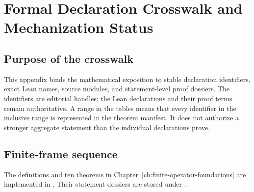 \chapter{Formal Declaration Crosswalk and Mechanization Status}
\label{app:formal-crosswalk}
\small
\sloppy
{}

\section{Purpose of the crosswalk}

This appendix binds the mathematical exposition to stable declaration identifiers,
exact Lean names, source modules, and statement-level proof dossiers. The identifiers
are editorial handles; the Lean declarations and their proof terms remain authoritative.
A range in the tables means that every identifier in the inclusive range is represented
in the theorem manifest. It does not authorize a stronger aggregate statement than the
individual declarations prove.

\section{Finite-frame sequence}

The definitions and ten theorems in Chapter~\ref{ch:finite-operator-foundations} are
implemented in
. Their statement dossiers
are stored under .

